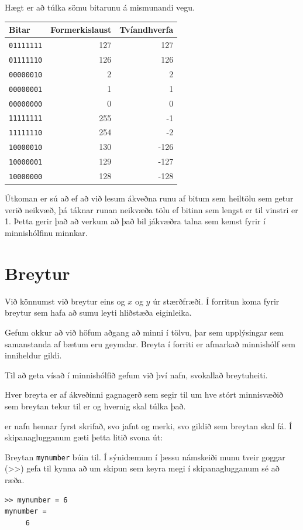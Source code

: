 \documentclass[justified,nobib]{tufte-handout}
\begin{document}
\begin{margintable}
\caption{Hægt er að túlka sömu bitarunu á mismunandi vegu.}
\begin{tabular}{lrr}
\toprule
Bitar&Formerkislaust&Tvíandhverfa\\
\midrule
\texttt{01111111}&127&127\\
\texttt{01111110}&126&126\\
\texttt{00000010}&2&2\\
\texttt{00000001}&1&1\\
\texttt{00000000}&0&0\\
\texttt{11111111}&255&-1\\
\texttt{11111110}&254&-2\\
\texttt{10000010}&130&-126\\
\texttt{10000001}&129&-127\\
\texttt{10000000}&128&-128\\
\bottomrule
\end{tabular}
\end{margintable}

Útkoman er sú að ef að við lesum ákveðna runu af bitum sem heiltölu sem getur verið neikvæð, þá táknar runan neikvæða tölu ef bitinn sem lengst er til vinstri er 1. Þetta gerir það að verkum að það bil jákvæðra talna sem kemst fyrir í minnishólfinu minnkar.

\section{Breytur}
Við könnumst við breytur eins og $x$ og $y$ úr stærðfræði. Í forritun koma fyrir breytur sem hafa að sumu leyti hliðstæða eiginleika.

Gefum okkur að við höfum aðgang að minni í tölvu, þar sem upplýsingar sem samanstanda af bætum eru geymdar. Breyta í forriti er afmarkað minnishólf sem inniheldur gildi.

Til að geta vísað í minnishólfið gefum við því nafn, svokallað breytuheiti.

Hver breyta er af ákveðinni gagnagerð sem segir til um hve stórt minnisvæðið sem breytan tekur til er og hvernig skal túlka það.

 er nafn hennar fyrst skrifað, svo jafnt og merki, svo gildið sem breytan skal fá. Í skipanaglugganum gæti þetta litið svona út:

\begin{example}
\caption{Breytan \texttt{mynumber} búin til. Í sýnidæmum í þessu námskeiði munu tveir goggar (>>) gefa til kynna að um skipun sem keyra megi í skipanaglugganum sé að ræða.}
\begin{verbatim}
>> mynumber = 6
mynumber =  
     6
\end{verbatim}
\end{example}
\end{document}
